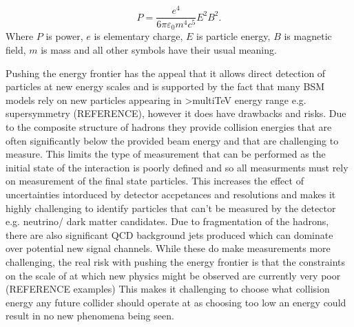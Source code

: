 \begin{equation}
\label{Eq:synchotron radiation}
P = \frac{e^4}{6\pi\varepsilon_0m^4c^5}E^2B^2.
\end{equation}
Where $P$ is power, $e$ is elementary charge, $E$ is particle energy, $B$ is magnetic field, $m$ is mass and all other symbols have their usual meaning.

Pushing the energy frontier has the appeal that it allows direct detection of particles at new energy scales and is supported by the fact that many \ac{BSM} models rely on new particles appearing in >multiTeV energy range e.g. supersymmetry (REFERENCE), however it does have drawbacks and risks. Due to the composite structure of hadrons they provide collision energies that are often significantly below the provided beam energy and that are challenging to measure. This limits the type of measurement that can be performed as the initial state of the interaction is poorly defined and so all measurments must rely on measurement of the final state particles. This increases the effect of uncertainties intorduced by detector accpetances and resolutions and makes it highly challenging to identify particles that can't be measured by the detector e.g. neutrino/ dark matter candidates. Due to fragmentation of the hadrons, there are also significant \ac{QCD} background jets produced which can dominate over potential new signal channels. While these do make measurements more challenging, the real risk with pushing the energy frontier is that the constraints on the scale of at which new physics might be observed are currently very poor (REFERENCE examples) This makes it challenging to choose what collision energy any future collider should operate at as choosing too low an energy could result in no new phenomena being seen.


